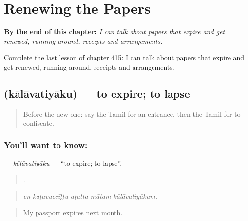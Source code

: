 
\chapter{Renewing the Papers}
\label{ch:ta-renewing-the-papers}

\begin{chapteropening}
\textbf{By the end of this chapter:} \emph{I can talk about papers that expire and get renewed, running around, receipts and arrangements.}

Complete the last lesson of chapter 415: I can talk about papers that expire and get renewed, running around, receipts and arrangements.
\end{chapteropening}

\section[\texorpdfstring{\ta{காலாவதியாகு} (kālāvatiyāku)}{காலாவதியாகு (kālāvatiyāku)}]{ (kālāvatiyāku) — to expire; to lapse}

\label{lesson:TA-C415-kalavatiyaku}



\begin{quote}
Before the new one: say the Tamil for an entrance, then the Tamil for to confiscate.
\end{quote}

\subsection*{You'll want to know: }
\textbf{} — \emph{kālāvatiyāku} — \textquotedblleft{}to expire; to lapse\textquotedblright{}.

\begin{quote}
    .
\end{quote}

\begin{quote}
\emph{eṉ kaṭavuccīṭṭu aṭutta mātam kālāvatiyākum.}
\end{quote}

\begin{quote}
My passport expires next month.
\end{quote}

